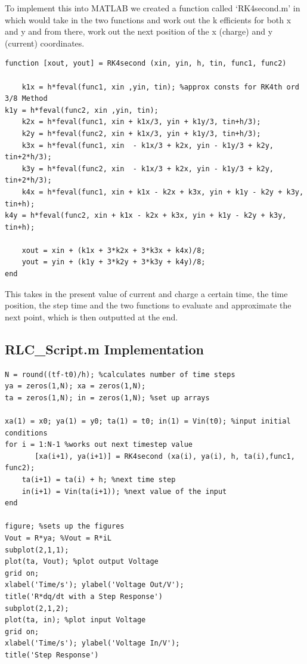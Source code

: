 \documentclass[11pt,a4paper]{article}
\begin{document}
To implement this into MATLAB we created a function called `RK4second.m' in which would take in the two functions and work out the k efficients for both x and y and from there, work out the next position of the x (charge) and y (current) coordinates.

\begin{verbatim}
function [xout, yout] = RK4second (xin, yin, h, tin, func1, func2)

	k1x = h*feval(func1, xin ,yin, tin); %approx consts for RK4th ord 3/8 Method
k1y = h*feval(func2, xin ,yin, tin);
	k2x = h*feval(func1, xin + k1x/3, yin + k1y/3, tin+h/3);
	k2y = h*feval(func2, xin + k1x/3, yin + k1y/3, tin+h/3);
	k3x = h*feval(func1, xin  - k1x/3 + k2x, yin - k1y/3 + k2y, tin+2*h/3);
	k3y = h*feval(func2, xin  - k1x/3 + k2x, yin - k1y/3 + k2y, tin+2*h/3);
	k4x = h*feval(func1, xin + k1x - k2x + k3x, yin + k1y - k2y + k3y, tin+h);
k4y = h*feval(func2, xin + k1x - k2x + k3x, yin + k1y - k2y + k3y, tin+h);

	xout = xin + (k1x + 3*k2x + 3*k3x + k4x)/8;
	yout = yin + (k1y + 3*k2y + 3*k3y + k4y)/8;
end
\end{verbatim}

This takes in the present value of current and charge a certain time, the time position, the step time and the two functions to evaluate and approximate the next point, which is then outputted at the end.

\subsection{RLC\_Script.m Implementation}

\begin{verbatim}
N = round((tf-t0)/h); %calculates number of time steps
ya = zeros(1,N); xa = zeros(1,N);
ta = zeros(1,N); in = zeros(1,N); %set up arrays

xa(1) = x0; ya(1) = y0; ta(1) = t0; in(1) = Vin(t0); %input initial conditions
for i = 1:N-1 %works out next timestep value
	   [xa(i+1), ya(i+1)] = RK4second (xa(i), ya(i), h, ta(i),func1, func2);
    ta(i+1) = ta(i) + h; %next time step
    in(i+1) = Vin(ta(i+1)); %next value of the input
end

figure; %sets up the figures
Vout = R*ya; %Vout = R*iL
subplot(2,1,1);
plot(ta, Vout); %plot output Voltage
grid on;
xlabel('Time/s'); ylabel('Voltage Out/V');
title('R*dq/dt with a Step Response')
subplot(2,1,2);
plot(ta, in); %plot input Voltage
grid on;
xlabel('Time/s'); ylabel('Voltage In/V');
title('Step Response')
\end{verbatim}
\end{document}
